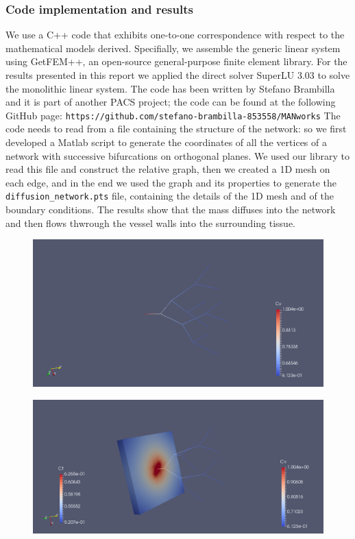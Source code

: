 \documentclass[10pt]{article} %
\begin{document}
	\subsubsection{Code implementation and results}
	We use a C++ code that exhibits one-to-one correspondence with respect to the
	mathematical models derived. Specifially, we assemble the generic linear
	system using GetFEM++, an open-source general-purpose finite element library. For the results presented in this report we applied the direct solver SuperLU 3.03 to solve the monolithic linear system.
	The code has been written by Stefano Brambilla and it is part of another PACS project; the code can be found at the following GitHub page: \texttt{https://github.com/stefano-brambilla-853558/MANworks}
	\newline\newline
	The code needs to read from a file containing the structure of the network: so we first developed a Matlab script to generate the coordinates of all the vertices of a network with successive bifurcations on orthogonal planes. We used our library to read this file and construct the relative graph, then we created a 1D mesh on each edge, and in the end we used the graph and its properties to generate the \texttt{diffusion\_network.pts} file, containing the details of the 1D mesh and of the boundary conditions.
	\newline
	The results show that the mass diffuses into the network and then flows thwrough the vessel walls into the surrounding tissue.
	
	\begin{figure}[h]
		\centering
		\includegraphics[width=0.9\linewidth]{cv}
		\label{fig:cv}
	\end{figure}
	
	\begin{figure}[h]
		\centering
		\includegraphics[width=0.9\linewidth]{ct1}
		\label{fig:ct1}
	\end{figure}
	
\end{document}

